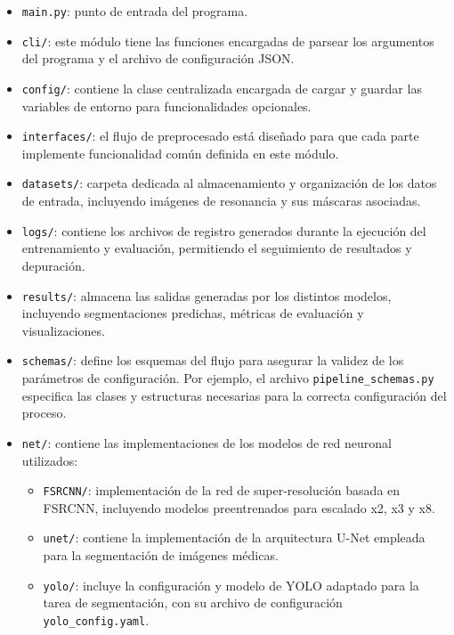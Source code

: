 \documentclass[../main.tex]{subfiles}
\begin{document}
\begin{itemize}
    \item \texttt{main.py}: punto de entrada del programa.

    \item \texttt{cli/}: este módulo tiene las funciones encargadas de parsear los argumentos del programa y el archivo de configuración JSON.

    \item \texttt{config/}: contiene la clase centralizada encargada de cargar y guardar las variables de entorno para funcionalidades opcionales.

    \item \texttt{interfaces/}: el flujo de preprocesado está diseñado para que cada parte implemente funcionalidad común definida en este módulo.
    
    \item \texttt{datasets/}: carpeta dedicada al almacenamiento y organización de los datos de entrada, incluyendo imágenes de resonancia y sus máscaras asociadas.
    
    \item \texttt{logs/}: contiene los archivos de registro generados durante la ejecución del entrenamiento y evaluación, permitiendo el seguimiento de resultados y depuración.
    
    \item \texttt{results/}: almacena las salidas generadas por los distintos modelos, incluyendo segmentaciones predichas, métricas de evaluación y visualizaciones.
    
    \item \texttt{schemas/}: define los esquemas del flujo para asegurar la validez de los parámetros de configuración. Por ejemplo, el archivo \texttt{pipeline\_schemas.py} especifica las clases y estructuras necesarias para la correcta configuración del proceso.
    
    \item \texttt{net/}: contiene las implementaciones de los modelos de red neuronal utilizados:
    \begin{itemize}
        \item \texttt{FSRCNN/}: implementación de la red de super-resolución basada en FSRCNN, incluyendo modelos preentrenados para escalado x2, x3 y x8.
        \item \texttt{unet/}: contiene la implementación de la arquitectura U-Net empleada para la segmentación de imágenes médicas.
        \item \texttt{yolo/}: incluye la configuración y modelo de YOLO adaptado para la tarea de segmentación, con su archivo de configuración \texttt{yolo\_config.yaml}.
    \end{itemize}
    

\end{itemize}
\end{document}
